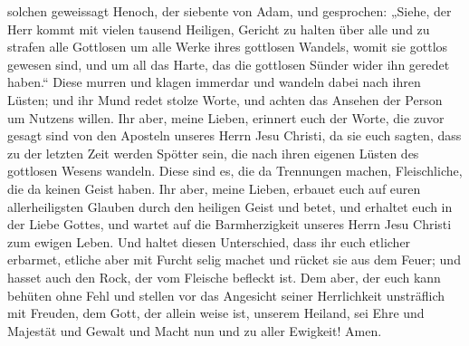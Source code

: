 solchen geweissagt Henoch, der siebente von Adam, und gesprochen:
„Siehe, der Herr kommt mit vielen tausend Heiligen, 
Gericht zu halten über alle und zu strafen alle Gottlosen um alle Werke
ihres gottlosen Wandels, womit sie gottlos gewesen sind, und um all das
Harte, das die gottlosen Sünder wider ihn geredet haben.``
 Diese murren und klagen immerdar und wandeln dabei nach
ihren Lüsten; und ihr Mund redet stolze Worte, und achten das Ansehen
der Person um Nutzens willen.  Ihr aber, meine Lieben,
erinnert euch der Worte, die zuvor gesagt sind von den Aposteln unseres
Herrn Jesu Christi,  da sie euch sagten, dass zu der
letzten Zeit werden Spötter sein, die nach ihren eigenen Lüsten des
gottlosen Wesens wandeln.  Diese sind es, die da
Trennungen machen, Fleischliche, die da keinen Geist haben.
 Ihr aber, meine Lieben, erbauet euch auf euren
allerheiligsten Glauben durch den heiligen Geist und betet,
 und erhaltet euch in der Liebe Gottes, und wartet auf
die Barmherzigkeit unseres Herrn Jesu Christi zum ewigen Leben.
 Und haltet diesen Unterschied, dass ihr euch etlicher
erbarmet,  etliche aber mit Furcht selig machet und
rücket sie aus dem Feuer; und hasset auch den Rock, der vom Fleische
befleckt ist.  Dem aber, der euch kann behüten ohne Fehl
und stellen vor das Angesicht seiner Herrlichkeit unsträflich mit
Freuden,  dem Gott, der allein weise ist, unserem
Heiland, sei Ehre und Majestät und Gewalt und Macht nun und zu aller
Ewigkeit! Amen.
